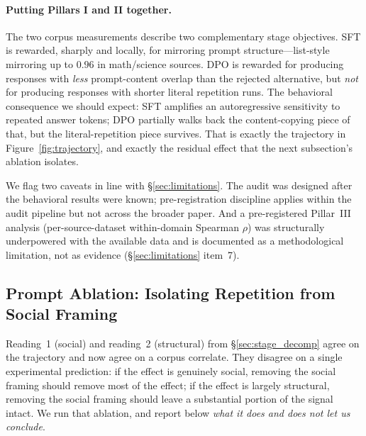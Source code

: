 \documentclass{article}
\begin{document}
\paragraph{Putting Pillars I and II together.}
The two corpus measurements describe two complementary stage objectives. SFT is rewarded, sharply and locally, for mirroring prompt structure---list-style mirroring up to $0.96$ in math/science sources. DPO is rewarded for producing responses with \emph{less} prompt-content overlap than the rejected alternative, but \emph{not} for producing responses with shorter literal repetition runs. The behavioral consequence we should expect: SFT amplifies an autoregressive sensitivity to repeated answer tokens; DPO partially walks back the content-copying piece of that, but the literal-repetition piece survives. That is exactly the trajectory in Figure~\ref{fig:trajectory}, and exactly the residual effect that the next subsection's ablation isolates.

We flag two caveats in line with \S\ref{sec:limitations}. The audit was designed after the behavioral results were known; pre-registration discipline applies within the audit pipeline but not across the broader paper. And a pre-registered Pillar~III analysis (per-source-dataset within-domain Spearman $\rho$) was structurally underpowered with the available data and is documented as a methodological limitation, not as evidence (\S\ref{sec:limitations} item~7).

\subsection{Prompt Ablation: Isolating Repetition from Social Framing}
\label{sec:ablation}

\noindent Reading~1 (social) and reading~2 (structural) from \S\ref{sec:stage_decomp} agree on the trajectory and now agree on a corpus correlate. They disagree on a single experimental prediction: if the effect is genuinely social, removing the social framing should remove most of the effect; if the effect is largely structural, removing the social framing should leave a substantial portion of the signal intact. We run that ablation, and report below \emph{what it does and does not let us conclude}.
\end{document}
